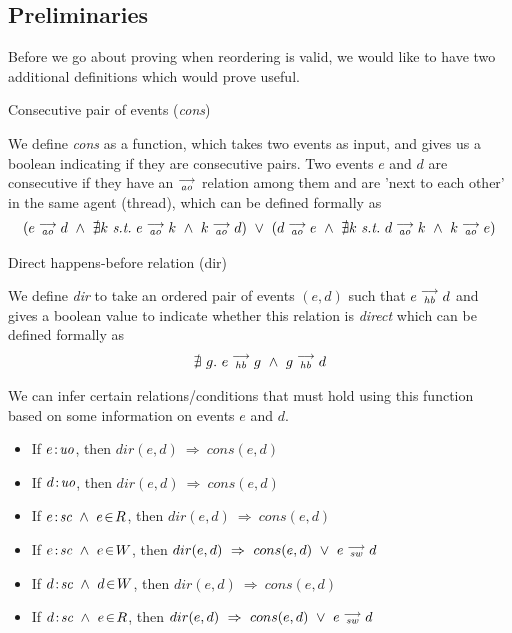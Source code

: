     \subsection{Preliminaries}
    Before we go about proving when reordering is valid, we would like to have two additional definitions which would prove useful.
    
    \begin{definition}{Consecutive pair of events (\emph{cons})}
        
        We define \emph{cons} as a function, which takes two events as input, and gives us a boolean indicating if they are consecutive pairs. Two events $e$ and $d$ are consecutive if they have an $\stackrel{\longrightarrow}{_\textit{ao}}$ relation among them and are 'next to each other' in the same agent (thread), which can be defined formally as 
            \begin{align*}
                (
                e \stck{_\textit{ao}} d  \ \wedge \ 
                \nexists k \ \textit{s.t.} \ 
                e \stck{_\textit{ao}} k  \ \wedge \
                k \stck{_\textit{ao}} d 
                )
                \ \vee \
                (
                    d \stck{_\textit{ao}} e  \ \wedge \ 
                    \nexists k \ \textit{s.t.} \ 
                    d \stck{_\textit{ao}} k  \ \wedge \
                    k \stck{_\textit{ao}} e  
                )
            \end{align*}
    \end{definition}

    \begin{definition}{Direct happens-before relation (dir)}
        
        We define \emph{dir} to take an ordered pair of events $(e,d)$ such that $e\stackrel{\longrightarrow}{_{\textit{hb}}}d$ and gives a boolean value to indicate whether this relation is \textit{direct} which can be defined formally as
        \begin{align*}
            \nexists \ g. \ e\stackrel{\longrightarrow}{_{\textit{hb}}}g \ \wedge \ g\stackrel{\longrightarrow}{_{\textit{hb}}}d
        \end{align*}

        We can infer certain relations/conditions that must hold using this function based on some information on events $e$ and $d$. 
        \begin{itemize}
            \item If $e\!:\!\textit{uo}$, then $dir(e,d) \ \Rightarrow \ cons(e,d)$
            \item If $d\!:\!\textit{uo}$, then $dir(e,d) \ \Rightarrow \ cons(e,d)$
            \item If $\et{e}{sc}\ \wedge\ e\!\in\!R$, then $dir(e,d) \ \Rightarrow \ cons(e,d)$
            \item If $\et{e}{sc}\ \wedge\ e\!\in\!W$, then $dir(e,d) \ \Rightarrow \ cons(e,d)\ \vee\ \reln{e}{sw}{d}$
            \item If $\et{d}{sc}\ \wedge\ d\!\in\!W$, then $dir(e,d) \ \Rightarrow \ cons(e,d)$
            \item If $\et{d}{sc}\ \wedge\ e\!\in\!R$, then $dir(e,d) \ \Rightarrow \ cons(e,d)\ \vee\ \reln{e}{sw}{d}$
        \end{itemize}
    \end{definition}
